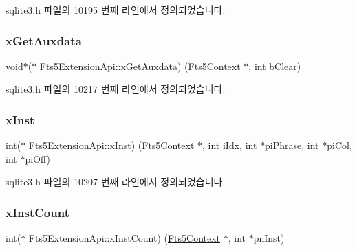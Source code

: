 sqlite3.\+h 파일의 10195 번째 라인에서 정의되었습니다.

\mbox{\label{struct_fts5_extension_api_a63ba9aaf30fe9fe5fbcd1541ff38abff}} 
\subsubsection{\texorpdfstring{x\+Get\+Auxdata}{xGetAuxdata}}
{\footnotesize\ttfamily void$\ast$($\ast$ Fts5\+Extension\+Api\+::x\+Get\+Auxdata) (\hyperlink{sqlite3_8h_a97821b95ebebd43db901977ffd5b26bc}{Fts5\+Context} $\ast$, int b\+Clear)}



sqlite3.\+h 파일의 10217 번째 라인에서 정의되었습니다.

\mbox{\label{struct_fts5_extension_api_a85e17f20db782b20b503f1d803a47a9e}} 
\subsubsection{\texorpdfstring{x\+Inst}{xInst}}
{\footnotesize\ttfamily int($\ast$ Fts5\+Extension\+Api\+::x\+Inst) (\hyperlink{sqlite3_8h_a97821b95ebebd43db901977ffd5b26bc}{Fts5\+Context} $\ast$, int i\+Idx, int $\ast$pi\+Phrase, int $\ast$pi\+Col, int $\ast$pi\+Off)}



sqlite3.\+h 파일의 10207 번째 라인에서 정의되었습니다.

\mbox{\label{struct_fts5_extension_api_af57aff7a8aa8402bb37a77892c4daf45}} 
\subsubsection{\texorpdfstring{x\+Inst\+Count}{xInstCount}}
{\footnotesize\ttfamily int($\ast$ Fts5\+Extension\+Api\+::x\+Inst\+Count) (\hyperlink{sqlite3_8h_a97821b95ebebd43db901977ffd5b26bc}{Fts5\+Context} $\ast$, int $\ast$pn\+Inst)}



